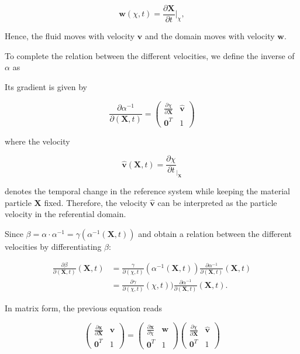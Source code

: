 \documentclass[a4paper,11pt,openright,twoside]{book}
\begin{document}
\begin{equation}
\mathbf{w}(\chi, t) = \frac{\partial \mathbf{X}}{\partial t}|_\chi,
\end{equation}

Hence, the fluid moves with velocity $\mathbf{v}$ and the domain moves with velocity $\mathbf{w}$.

To complete the relation between the different velocities, we define the inverse of $\alpha$ as


Its gradient is given by

\begin{equation}
\frac{\partial \alpha^{-1}}{\partial(\mathbf{X}, t)} = 
\begin{pmatrix}
\frac{\partial \chi}{\partial \mathbf{X}} & \hat{\mathbf{v}}\\
\mathbf{0}^T & 1
\end{pmatrix}
\end{equation}

where the velocity

\begin{equation}
\label{eq:ale:4}
\hat{\mathbf{v}} (\mathbf{X},t) = \frac{\partial \chi}{\partial t}_{|_{\mathbf{X}}}
\end{equation}

denotes the temporal change in the reference system while keeping the material particle $\mathbf{X}$ fixed. Therefore, the velocity $\mathbf{\hat{v}}$ can be interpreted as the particle velocity in the referential domain.

Since $\beta = \alpha \cdot \alpha^{-1} = \gamma(\alpha^{-1}(\mathbf{X},t))$ and obtain a relation between the different velocities by differentiating $\beta$:

\begin{align*}
\frac{\partial \beta}{\partial (\mathbf{X},t)} (\mathbf{X},t)
& = \frac{\gamma}{\partial (\chi, t)}(\alpha^{-1}(\mathbf{X},t)) \frac{\partial \alpha^{-1}}{\partial(\mathbf{X},t)}(\mathbf{X},t) \\
& = \frac{\partial \gamma}{\partial (\chi, t)}(\chi,t)) \frac{\partial \alpha^{-1}}{\partial(\mathbf{X},t)}(\mathbf{X},t).
\end{align*}

In matrix form, the previous equation reads

\begin{equation}
\begin{pmatrix}
\frac{\partial \mathbf{x}}{\partial \mathbf{X}} & \mathbf{v}\\
\mathbf{0}^T & 1
\end{pmatrix} = 
\begin{pmatrix}
\frac{\partial \mathbf{x}}{\partial \chi} & \mathbf{w}\\
\mathbf{0}^T & 1
\end{pmatrix}
\begin{pmatrix}
\frac{\partial \chi}{\partial \mathbf{X}} & \hat{\mathbf{v}}\\
\mathbf{0}^T & 1
\end{pmatrix}
\end{equation}
\end{document}
